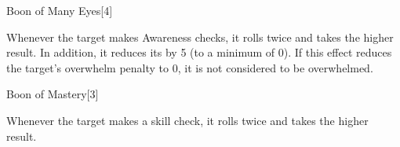 \begin{spellsection}{Boon of Many Eyes}[4]
    \begin{spellheader}
    \end{spellheader}
    \begin{spellcontent}
        \begin{spelltargetinginfo}
        \end{spelltargetinginfo}
        \begin{spelleffects}
            \spelleffect Whenever the target makes Awareness checks, it rolls twice and takes the higher result.
            In addition, it reduces its  by 5 (to a minimum of 0).
            If this effect reduces the target's overwhelm penalty to 0, it is not considered to be overwhelmed.
            \spelldur \durshort
        \end{spelleffects}
    \end{spellcontent}
    \begin{spellfooter}
        \miscastrandom
    \end{spellfooter}
\end{spellsection}

\begin{spellsection}{Boon of Mastery}[3]
    \begin{spellheader}
    \end{spellheader}
    \begin{spellcontent}
        \begin{spelltargetinginfo}
        \end{spelltargetinginfo}
        \begin{spelleffects}
            \spelleffect Whenever the target makes a skill check, it rolls twice and takes the higher result.
            \spelldur \durshort
        \end{spelleffects}
    \end{spellcontent}
    \begin{spellfooter}
        \miscastrandom
    \end{spellfooter}
    \begin{spellaugments}
    \end{spellaugments}
\end{spellsection}

